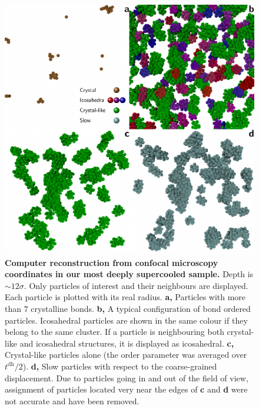 \begin{figure}
\includegraphics{fig_3D.pdf}
\caption{\textbf{Computer reconstruction from confocal microscopy coordinates in our most deeply supercooled sample.} Depth is $\sim 12\sigma$. Only particles of interest and their neighbours are displayed. Each particle is plotted with its real radius. \textbf{a,} Particles with more than $7$ crystalline bonds. \textbf{b,} A typical configuration of bond ordered particles. Icosahedral particles are shown in the same colour if they belong to the same cluster. If a particle is neighbouring both crystal-like and icosahedral structures, it is displayed as icosahedral. \textbf{c,} Crystal-like particles alone (the order parameter was averaged over $t^\text{dh}/2$). \textbf{d,} Slow particles with respect to the coarse-grained displacement. Due to particles going in and out of the field of view, assignment of particles located very near the edges of \textbf{c} and \textbf{d} were not accurate and have been removed.}
	\label{fig:3D}
\end{figure}
\clearpage

